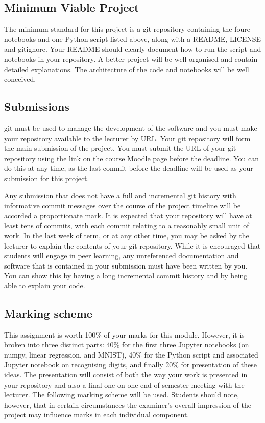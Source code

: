 \documentclass[12pt, a4paper]{article}
\begin{document}
\subsection*{Minimum Viable Project}
The minimum standard for this project is a git repository containing the foure notebooks and one Python script listed above, along with a README, LICENSE and gitignore.
Your README should clearly document how to run the script and notebooks in your repository.
A better project will be well organised and contain detailed explanations.
The architecture of the code and notebooks will be well conceived.


\subsection*{Submissions}
git must be used to manage the development of the software and you must make your repository available to the lecturer by URL.
Your git repository will form the main submission of the project.
You must submit the URL of your git repository using the link on the course Moodle page before the deadline.
You can do this at any time, as the last commit before the deadline will be used as your submission for this project.

Any submission that does not have a full and incremental git history with informative commit messages over the course of the project timeline will be accorded a proportionate mark.
It is expected that your repository will have at least tens of commits, with each commit relating to a reasonably small unit of work.
In the last week of term, or at any other time, you may be asked by the lecturer to explain the contents of your git repository.
While it is encouraged that students will engage in peer learning, any unreferenced documentation and software that is contained in your submission must have been written by you.
You can show this by having a long incremental commit history and by being able to explain your code.

\subsection*{Marking scheme}
This assignment is worth 100\% of your marks for this module.
However, it is broken into three distinct parts: 40\% for the first three Jupyter notebooks (on numpy, linear regression, and MNIST), 40\% for the Python script and associated Jupyter notebook on recognising digits, and finally 20\% for presentation of these ideas.
The presentation will consist of both the way your work is presented in your repository and also a final one-on-one end of semester meeting with the lecturer.
The following marking scheme will be used.
Students should note, however, that in certain circumstances the examiner's overall impression of the project may influence marks in each individual component.
\end{document}
